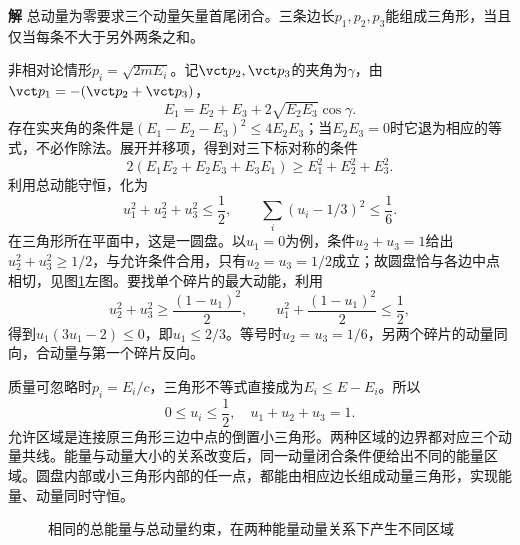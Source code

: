 \documentclass[11pt,openany,fontset=fandol]{ctexbook}
\theoremstyle{definition}\newtheorem{example}{例}[chapter]\newtheorem{exercise}{习题}[chapter]
\newcommand{\SolutionStart}{\par\medskip\ifdim\pagetotal>0pt\ifdim\dimexpr\pagegoal-\pagetotal\relax<3\baselineskip\newpage\fi\fi\noindent\textbf{解}\quad\ignorespaces}
\newenvironment{solution}{\SolutionStart}{\par\medskip}
\begin{document}
\begin{solution}
总动量为零要求三个动量矢量首尾闭合。三条边长$p_1,p_2,p_3$能组成三角形，当且仅当每条不大于另外两条之和。

非相对论情形$p_i=\sqrt{2mE_i}$。记$\vct p_2,\vct p_3$的夹角为$\gamma$，由$\vct p_1=-(\vct p_2+\vct p_3)$，
\[
E_1=E_2+E_3+2\sqrt{E_2E_3}\cos\gamma.
\]
存在实夹角的条件是$(E_1-E_2-E_3)^2\le4E_2E_3$；当$E_2E_3=0$时它退为相应的等式，不必作除法。展开并移项，得到对三下标对称的条件
\[
 2(E_1E_2+E_2E_3+E_3E_1)\ge E_1^2+E_2^2+E_3^2.
\]
利用总动能守恒，化为
\[
 \boxed{u_1^2+u_2^2+u_3^2\le\frac12},\qquad
 \sum_i(u_i-1/3)^2\le\frac16.
\]
在三角形所在平面中，这是一圆盘。以$u_1=0$为例，条件$u_2+u_3=1$给出$u_2^2+u_3^2\ge1/2$，与允许条件合用，只有$u_2=u_3=1/2$成立；故圆盘恰与各边中点相切，见图\ref{mp4:fig:hw:l4-28-s}左图。要找单个碎片的最大动能，利用
\[
u_2^2+u_3^2\ge\frac{(1-u_1)^2}{2},\qquad
u_1^2+\frac{(1-u_1)^2}{2}\le\frac12,
\]
得到$u_1(3u_1-2)\le0$，即$u_1\le2/3$。等号时$u_2=u_3=1/6$，另两个碎片的动量同向，合动量与第一个碎片反向。

质量可忽略时$p_i=E_i/c$，三角形不等式直接成为$E_i\le E-E_i$。所以
\[
 \boxed{0\le u_i\le\frac12,\quad u_1+u_2+u_3=1}.
\]
允许区域是连接原三角形三边中点的倒置小三角形。两种区域的边界都对应三个动量共线。能量与动量大小的关系改变后，同一动量闭合条件便给出不同的能量区域。圆盘内部或小三角形内部的任一点，都能由相应边长组成动量三角形，实现能量、动量同时守恒。


\begin{figure}[H]\centering
{}
\caption{相同的总能量与总动量约束，在两种能量动量关系下产生不同区域}\label{mp4:fig:hw:l4-28-s}
\end{figure}

\end{solution}
\end{document}

